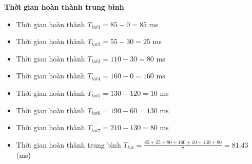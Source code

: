 \documentclass[12pt, letterpaper]{article}
\begin{document}
\textbf{Thời gian hoàn thành trung bình}
\begin{itemize}
    \item Thời gian hoàn thành $T_{tat1} = 85 - 0 = 85$ ms
    \item Thời gian hoàn thành $T_{tat2} = 55 - 30 = 25$ ms
    \item Thời gian hoàn thành $T_{tat3} = 110 - 30 = 80$ ms
    \item Thời gian hoàn thành $T_{tat4} = 160 - 0 = 160$ ms
    \item Thời gian hoàn thành $T_{tat5} = 130 - 120 = 10$ ms
    \item Thời gian hoàn thành $T_{tat6} = 190 - 60 = 130$ ms
    \item Thời gian hoàn thành $T_{tat7} = 210 - 130 = 80$ ms
    \item Thời gian hoàn thành trung bình $T_{tat} = \frac{85 + 25 + 80 + 160 + 10 + 130 + 80}{7} = 81.43$ (ms)
\end{itemize}
\end{document}
